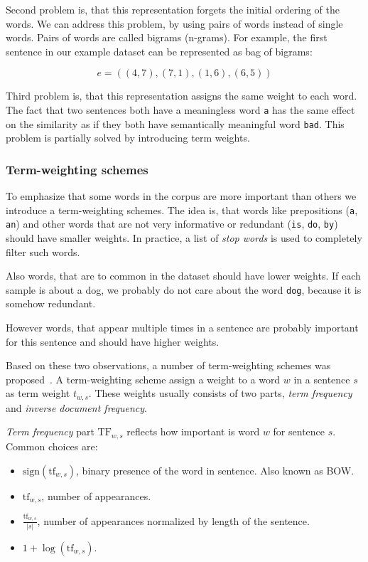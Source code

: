     Second problem is, that this representation forgets the initial ordering of the words.
    We can address this problem, by using pairs of words instead of single words. 
    Pairs of words are called bigrams (n-grams).
    For example, the first sentence in our example dataset can be represented as bag of bigrams:
    
    $$e = ((4,7),(7,1),(1,6),(6,5))$$
    
    Third problem is, that this representation assigns the same weight to each word.
    The fact that two sentences both have a meaningless word \texttt{a} has the same effect on the similarity as if they both have semantically meaningful word \texttt{bad}. 
    This problem is partially solved by introducing term weights.
    
    
    \subsubsection{Term-weighting schemes} \label{sec:term:weights}
    
    To emphasize that some words in the corpus are more important than others we introduce a term-weighting schemes. 
    The idea is, that words like prepositions (\texttt{a}, \texttt{an}) and other words that are not very informative or redundant (\texttt{is}, \texttt{do}, \texttt{by}) should have smaller weights. 
    In practice, a list of \textit{stop words} is used to completely filter such words.
    
    Also words, that are to common in the dataset should have lower weights.
    If each sample is about a dog, we probably do not care about the word \texttt{dog}, because it is somehow redundant.
    
    However words, that appear multiple times in a sentence are probably important for this sentence and should have higher weights.
    
    Based on these two observations, a number of term-weighting schemes was proposed~\cite{salton1988term}.
    A term-weighting scheme assign a weight to a word $w$ in a sentence $s$ as term weight $t_{w,s}$.
    These weights usually consists of two parts, \emph{term frequency} and \emph{inverse document frequency}. 
    
    \emph{Term frequency} part $\mathrm{TF}_{w,s}$ reflects how important is word $w$ for sentence $s$.
    Common choices are:
    \begin{itemize}
        \item $\mathrm{sign}(\mathrm{tf}_{w,s})$, binary presence of the word in sentence. Also known as BOW.
        \item $\mathrm{tf}_{w,s}$, number of appearances.
        \item $\frac{\mathrm{tf}_{w,s}}{|s|}$, number of appearances normalized by length of the sentence.
        \item $1+\log(\mathrm{tf}_{w,s})$.
    \end{itemize}
    

